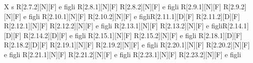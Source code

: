 \begin{longtable}{X s}
		R[2.7.2][N][F] e figli \newline R[2.8.1][N][F] \newline R[2.8.2][N][F] e figli \newline 
		R[2.9.1][N][F] \newline R[2.9.2][N][F] e figli \newline R[2.10.1][N][F] \newline 
		R[2.10.2][N][F] e figli\newline R[2.11.1][D][F] \newline R[2.11.2][D][F] \newline
		R[2.12.1][N][F] \newline R[2.12.2][N][F] e figli \newline R[2.13.1][N][F] \newline
		R[2.13.2][N][F] e figli\newline R[2.14.1][D][F] \newline R[2.14.2][D][F] e figli \newline
		R[2.15.1][N][F] \newline R[2.15.2][N][F] e figli \newline R[2.18.1][D][F] \newline
		R[2.18.2][D][F] \newline R[2.19.1][N][F] \newline R[2.19.2][N][F] e figli \newline
		R[2.20.1][N][F] \newline R[2.20.2][N][F] e figli \newline R[2.21.1][N][F] \newline
		R[2.21.2][N][F] e figli \newline R[2.23.1][N][F] \newline R[2.23.2][N][F] e figli
	\\
\bottomrule
\caption{Componenti-Requisiti}
\end{longtable}   